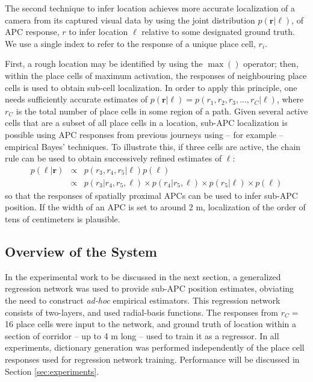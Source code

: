 The second technique to infer location achieves more accurate localization of a camera from its captured visual data by using the joint distribution $p(\mathbf{r}|\ell)$, of APC response, $r$ to infer location $\ell$ relative to some designated ground truth.  We use a single index to refer to the response of a unique place cell, $r_i$.

 First, a rough location may be identified by using the $\max()$ operator; then, within the place cells of maximum activation, the responses of neighbouring place cells is used to obtain sub-cell localization.  In order to apply this principle, one needs sufficiently accurate estimates of $p(\mathbf{r}|\ell) = p(r_1,r_2,r_3,...,r_C|\ell)$, where $r_C$ is the total number of place cells in some region of a path.   Given several active cells that are a subset of all place cells in a location, sub-APC localization is possible using APC responses from previous journeys using -- for example -- empirical Bayes' techniques. To illustrate this, if three cells are active, the chain rule can be used to obtain successively refined estimates of $\ell$:
\begin{eqnarray}
p(\ell|\mathbf{r}) & \propto & p(r_3,r_4,r_5|\ell)p(\ell) \nonumber \\
&\propto& p(r_3|r_4,r_5,\ell)\times p(r_4|r_5,\ell)\times p(r_5|\ell)\times p(\ell)
\end{eqnarray}
 so that the responses of spatially proximal APCs can be used to infer sub-APC position.  If the width of an APC is set to around 2 m, localization of the order of tens of centimeters is plausible. 





\subsection{Overview of the System}
\label{ch05:overview}
In the experimental work to be discussed in the next section, a generalized regression network was used to provide sub-APC position estimates, obviating the need to construct {\em ad-hoc} empirical estimators.  This regression network consists of two-layers, and used radial-basis functions.  The responses from $r_C =$ 16 place cells were input to the network, and ground truth of location within a section of corridor -- up to 4 m long -- used to train it as a regressor.  In all experiments, dictionary generation was performed independently of the place cell responses used for regression network training.  Performance will be discussed in Section \ref{sec:experiments}.

